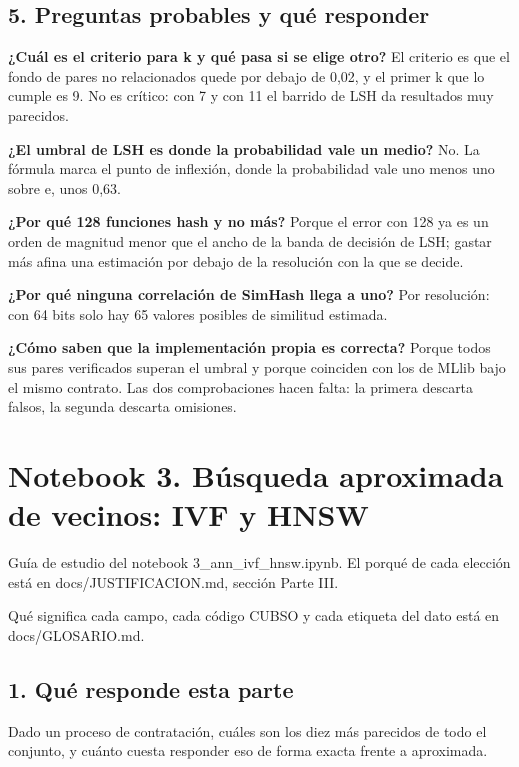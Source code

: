 \documentclass[11pt]{article}
\begin{document}
\subsection*{5. Preguntas probables y qué responder}
\textbf{¿Cuál es el criterio para k y qué pasa si se elige otro?} El criterio es que el fondo de pares no relacionados quede por debajo de 0,02, y el primer k que lo cumple es 9. No es crítico: con 7 y con 11 el barrido de LSH da resultados muy parecidos.

\textbf{¿El umbral de LSH es donde la probabilidad vale un medio?} No. La fórmula marca el punto de inflexión, donde la probabilidad vale uno menos uno sobre e, unos 0,63.

\textbf{¿Por qué 128 funciones hash y no más?} Porque el error con 128 ya es un orden de magnitud menor que el ancho de la banda de decisión de LSH; gastar más afina una estimación por debajo de la resolución con la que se decide.

\textbf{¿Por qué ninguna correlación de SimHash llega a uno?} Por resolución: con 64 bits solo hay 65 valores posibles de similitud estimada.

\textbf{¿Cómo saben que la implementación propia es correcta?} Porque todos sus pares verificados superan el umbral y porque coinciden con los de MLlib bajo el mismo contrato. Las dos comprobaciones hacen falta: la primera descarta falsos, la segunda descarta omisiones.


\clearpage
{}
\section*{Notebook 3. Búsqueda aproximada de vecinos: IVF y HNSW}
Guía de estudio del notebook 3\_\allowbreak{}ann\_\allowbreak{}ivf\_\allowbreak{}hnsw.ipynb. El porqué de cada elección está en docs/JUSTIFICACION.md, sección Parte III.

Qué significa cada campo, cada código CUBSO y cada etiqueta del dato está en docs/GLOSARIO.md.

\subsection*{1. Qué responde esta parte}
Dado un proceso de contratación, cuáles son los diez más parecidos de todo el conjunto, y cuánto cuesta responder eso de forma exacta frente a aproximada.
\end{document}
